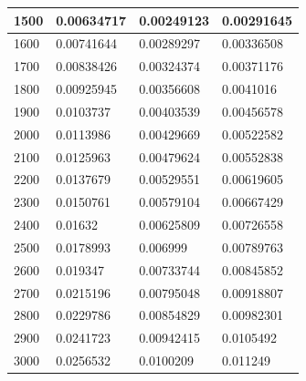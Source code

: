 \documentclass[11pt,spanish]{article} %
\begin{document}
\begin{center}
\begin{longtable}{|l||l|l|l|}
1500                    & 0.00634717                   & 0.00249123                     & 0.00291645                     \\ \hline
1600                    & 0.00741644                   & 0.00289297                     & 0.00336508                     \\ \hline
1700                    & 0.00838426                   & 0.00324374                     & 0.00371176                     \\ \hline
1800                    & 0.00925945                   & 0.00356608                     & 0.0041016                      \\ \hline
1900                    & 0.0103737                    & 0.00403539                     & 0.00456578                     \\ \hline
2000                    & 0.0113986                    & 0.00429669                     & 0.00522582                     \\ \hline
2100                    & 0.0125963                    & 0.00479624                     & 0.00552838                     \\ \hline
2200                    & 0.0137679                    & 0.00529551                     & 0.00619605                     \\ \hline
2300                    & 0.0150761                    & 0.00579104                     & 0.00667429                     \\ \hline
2400                    & 0.01632                      & 0.00625809                     & 0.00726558                     \\ \hline
2500                    & 0.0178993                    & 0.006999                       & 0.00789763                     \\ \hline
2600                    & 0.019347                     & 0.00733744                     & 0.00845852                     \\ \hline
2700                    & 0.0215196                    & 0.00795048                     & 0.00918807                     \\ \hline
2800                    & 0.0229786                    & 0.00854829                     & 0.00982301                     \\ \hline
2900                    & 0.0241723                    & 0.00942415                     & 0.0105492                      \\ \hline
3000                    & 0.0256532                    & 0.0100209                      & 0.011249                       \\ \hline

\end{longtable}
\end{center}
\end{document}
